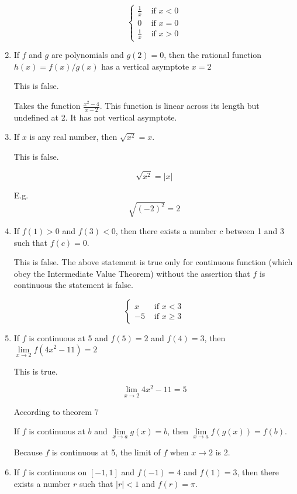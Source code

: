 \documentclass{article}
\begin{document}
\begin{enumerate}
		\[ \begin{cases}
			\frac{1}{x} & \text{ if } x < 0 \\
			0 & \text{ if } x = 0 \\
			\frac{1}{x} & \text{ if } x > 0 
		\end{cases} \]
	
			
	\item If $f$ and $g$ are polynomials and $g(2) = 0$, then the rational
		function $h(x) = f(x)/g(x)$ has a vertical asymptote $x = 2$

		This is false.

		Takes the function $\frac{x^2 - 4}{x-2}$. This function is linear
		across its length but undefined at 2. It has not vertical asymptote.

	\item If $x$ is any real number, then $\sqrt{x^2} = x$.

		This is false. 

		$$\sqrt{x^2} = |x|$$

		E.g. $$\sqrt{(-2)^2} = 2$$

	\item If $f(1) > 0$ and $f(3) < 0$, then there exists a number $c$ between
		1 and 3 such that $f(c) = 0$.

		This is false. The above statement is true only for continuous function
		(which obey the Intermediate Value Theorem) without the assertion that $f$
		is continuous the statement is false.

		$$ \begin{cases}
			x & \text{ if } x < 3 \\
			-5 & \text{ if } x \geq 3
		\end{cases}$$

	\item If $f$ is continuous at 5 and $f(5) = 2$ and $f(4) = 3$, then
		$\lim \limits _{x \to 2} f(4x^2 - 11) = 2$

		This is true.

		$$\lim \limits _{x \to 2} 4x^2 - 11 = 5$$

		According to theorem 7

		If $f$ is continuous at $b$ and $\lim \limits _{x \to a} g(x) = b$,
		then $\lim \limits _{x \to a} f(g(x)) = f(b)$.

		Because $f$ is continuous at 5, the limit of $f$ when $x \to 2$ is
		2.		

	\item If $f$ is continuous on $[-1,1]$ and $f(-1) = 4$ and $f(1) = 3$, then there
		exists a number $r$ such that $|r| < 1$ and $f(r) = \pi$.


\end{enumerate}
\end{document}
